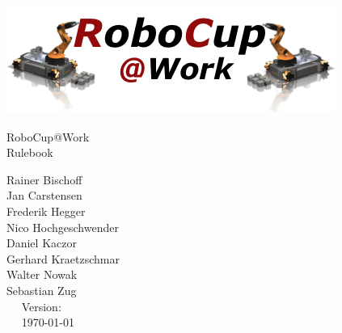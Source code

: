 \begin{titlepage}
  \begin{center}
    {
      
      \includegraphics[width=\textwidth]{images/logo_RoboCupAtWork.png}\\[1.23ex]
    }
    \vspace{2.7 cm}
    \hrulefill\par
    {%
      \vspace*{.27cm}
      \Huge{RoboCup@Work}\\[1.23ex]
      \Large Rulebook \\[2ex]
    }
    



    \hrulefill\par
    
    \vfill

    
    Rainer Bischoff\\
	Jan Carstensen\\
	Frederik Hegger\\
	Nico Hochgeschwender\\
	Daniel Kaczor\\
	Gerhard Kraetzschmar\\
	Walter Nowak\\
	Sebastian Zug\\
    
    \vfill
    ~~ Version: \YEAR ~~ \\
    ~~  \today ~~ \\
  \end{center}
\end{titlepage}
